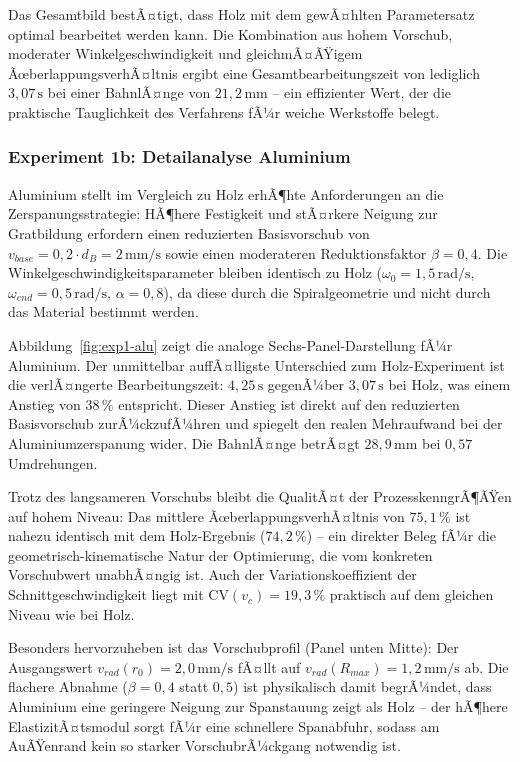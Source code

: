 ﻿\documentclass[12pt,a4paper]{article}
\begin{document}
Das Gesamtbild bestÃ¤tigt, dass Holz mit dem gewÃ¤hlten Parametersatz optimal bearbeitet werden kann. Die Kombination aus hohem Vorschub, moderater Winkelgeschwindigkeit und gleichmÃ¤ÃŸigem ÃœberlappungsverhÃ¤ltnis ergibt eine Gesamtbearbeitungszeit von lediglich $3{,}07\,\text{s}$ bei einer BahnlÃ¤nge von $21{,}2\,\text{mm}$ -- ein effizienter Wert, der die praktische Tauglichkeit des Verfahrens fÃ¼r weiche Werkstoffe belegt.

\subsubsection{Experiment 1b: Detailanalyse Aluminium}

Aluminium stellt im Vergleich zu Holz erhÃ¶hte Anforderungen an die Zerspanungsstrategie: HÃ¶here Festigkeit und stÃ¤rkere Neigung zur Gratbildung erfordern einen reduzierten Basisvorschub von $v_{base} = 0{,}2 \cdot d_B = 2\,\text{mm/s}$ sowie einen moderateren Reduktionsfaktor $\beta = 0{,}4$. Die Winkelgeschwindigkeitsparameter bleiben identisch zu Holz ($\omega_0 = 1{,}5\,\text{rad/s}$, $\omega_{end} = 0{,}5\,\text{rad/s}$, $\alpha = 0{,}8$), da diese durch die Spiralgeometrie und nicht durch das Material bestimmt werden.

Abbildung~\ref{fig:exp1-alu} zeigt die analoge Sechs-Panel-Darstellung fÃ¼r Aluminium. Der unmittelbar auffÃ¤lligste Unterschied zum Holz-Experiment ist die verlÃ¤ngerte Bearbeitungszeit: $4{,}25\,\text{s}$ gegenÃ¼ber $3{,}07\,\text{s}$ bei Holz, was einem Anstieg von $38\,\%$ entspricht. Dieser Anstieg ist direkt auf den reduzierten Basisvorschub zurÃ¼ckzufÃ¼hren und spiegelt den realen Mehraufwand bei der Aluminiumzerspanung wider. Die BahnlÃ¤nge betrÃ¤gt $28{,}9\,\text{mm}$ bei $0{,}57$ Umdrehungen.

Trotz des langsameren Vorschubs bleibt die QualitÃ¤t der ProzesskenngrÃ¶ÃŸen auf hohem Niveau: Das mittlere ÃœberlappungsverhÃ¤ltnis von $75{,}1\,\%$ ist nahezu identisch mit dem Holz-Ergebnis ($74{,}2\,\%$) -- ein direkter Beleg fÃ¼r die geometrisch-kinematische Natur der Optimierung, die vom konkreten Vorschubwert unabhÃ¤ngig ist. Auch der Variationskoeffizient der Schnittgeschwindigkeit liegt mit $\mathrm{CV}(v_c) = 19{,}3\,\%$ praktisch auf dem gleichen Niveau wie bei Holz.

Besonders hervorzuheben ist das Vorschubprofil (Panel unten Mitte): Der Ausgangswert $v_{rad}(r_0) = 2{,}0\,\text{mm/s}$ fÃ¤llt auf $v_{rad}(R_{max}) = 1{,}2\,\text{mm/s}$ ab. Die flachere Abnahme ($\beta = 0{,}4$ statt $0{,}5$) ist physikalisch damit begrÃ¼ndet, dass Aluminium eine geringere Neigung zur Spanstauung zeigt als Holz -- der hÃ¶here ElastizitÃ¤tsmodul sorgt fÃ¼r eine schnellere Spanabfuhr, sodass am AuÃŸenrand kein so starker VorschubrÃ¼ckgang notwendig ist.
\end{document}
